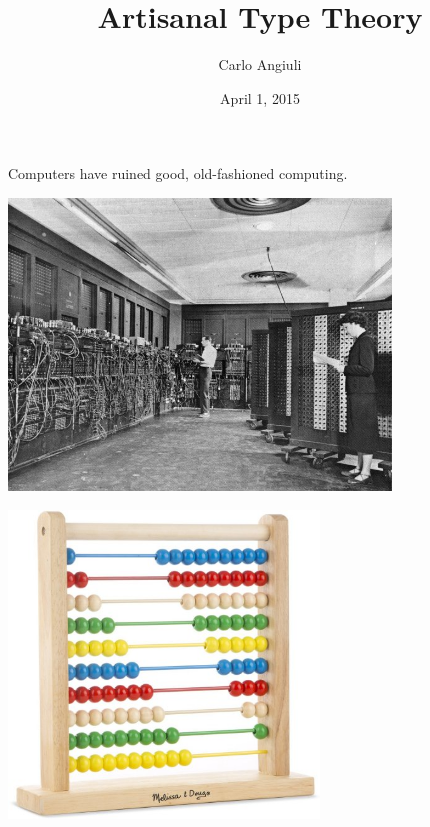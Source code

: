 \documentclass{beamer}
\title{Artisanal Type Theory}
\author{Carlo Angiuli}
\date{April 1, 2015}
\institute{Carnegie Mellon University}
\begin{document}
\begin{frame}
\maketitle
\end{frame}

\begin{frame}
\centering
{\LARGE Computers have ruined good, old-fashioned computing.}
\end{frame}

\begin{frame}
\centering
\includegraphics[width=4in]{eniac.jpg}
\end{frame}

\begin{frame}
\centering
\includegraphics[width=3.25in]{abacus.jpg}
\end{frame}
\end{document}
